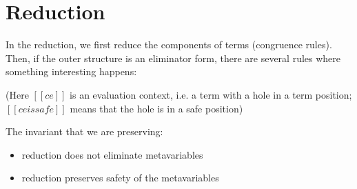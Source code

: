 \documentclass[acmsmall,natbib=false,review,anonymous]{acmart}
\begin{document}
    \ottdefnWfInertLabeled{}
\newpage

\section{Reduction}
  
  In the reduction, we first reduce the
  components of terms (congruence rules).
  Then, if the outer structure is an eliminator form,
  there are several rules where something interesting happens:
  \begin{ottdefnblock}[#2]{\ottdefnHeaderRedRed}{}
    \ottusedrule{\ottdruleRedRedAppLamLabeled[#1]{}}
    \ottusedrule{\ottdruleRedRedAppPLamLabeled[#1]{}}
    \ottusedrule{\ottdruleRedRedLRedSafeLabeled[#1]{}}
    \ottusedrule{\ottdruleRedRedLRedNeutLabeled[#1]{}}
    \ottusedrule{\ottdruleRedRedLRedGrLabeled[#1]{}}
    \ottusedrule{\ottdruleRedRedLNotinLabeled[#1]{}}
  \end{ottdefnblock}
  (Here $[[ce]]$ is an evaluation context, i.e. a term with a hole 
  in a term position; $[[ce is safe]]$ means that the hole is in a safe position)

  The invariant that we are preserving:
  \begin{itemize}
    \item reduction does not eliminate metavariables
    \item reduction preserves safety of the metavariables
  \end{itemize}
\end{document}
